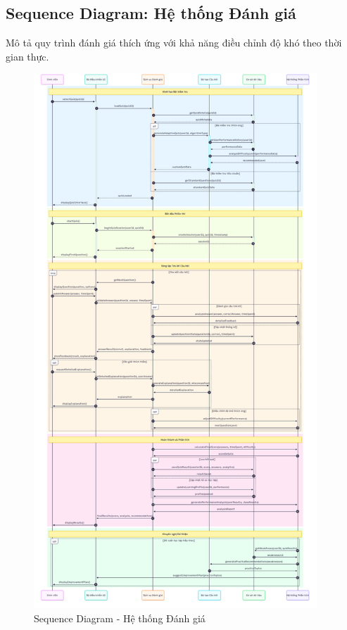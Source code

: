 \subsection{Sequence Diagram: Hệ thống Đánh giá}
\label{subsec:assessment-sequence}

Mô tả quy trình đánh giá thích ứng với khả năng điều chỉnh độ khó theo thời gian thực.

\begin{figure}[H]
\centering
\includegraphics[width=0.95\textwidth]{images/sequence-assessment-system.png}
\caption{Sequence Diagram - Hệ thống Đánh giá}
\label{fig:sequence-assessment-system}
\end{figure}

